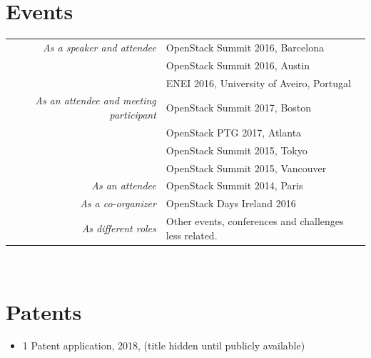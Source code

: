 \documentclass[letter,10pt]{article} %
\begin{document}

\section{Events}
\begin{tabular}{r|p{11cm}}
    \emph{As a speaker and attendee} & OpenStack Summit 2016, Barcelona \\
     & OpenStack Summit 2016, Austin\\
     & ENEI 2016, University of Aveiro, Portugal\\
    \emph{As an attendee and meeting participant} & OpenStack Summit 2017, Boston \\
     & OpenStack PTG 2017, Atlanta \\
     & OpenStack Summit 2015, Tokyo \\
     & OpenStack Summit 2015, Vancouver \\
    \emph{As an attendee} & OpenStack Summit 2014, Paris \\
    \emph{As a co-organizer} & OpenStack Days Ireland 2016 \\
    \emph{As different roles} & Other events, conferences and challenges less related. \\
\end{tabular} \\


\section{Patents}
\begin{itemize}
    \item 1 Patent application, 2018, (title hidden until publicly available)
\end{itemize}


\end{document}
